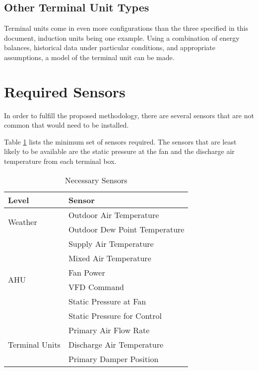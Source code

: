 \subsection{Other Terminal Unit Types}

Terminal units come in even more configurations than the three specified in this document, induction units being one example. Using a combination of energy balances, historical data under particular conditions, and appropriate assumptions, a model of the terminal unit can be made. 

\section{Required Sensors}

In order to fulfill the proposed methodology, there are several sensors that are not common that would need to be installed. 

Table \ref{tab:NecessarySensors} lists the minimum set of sensors required. The sensors that are least likely to be available are the static pressure at the fan and the discharge air temperature from each terminal box.

\begin{table}
\centering
\begin{tabular}{l l}
\toprule

Level & Sensor \\
\midrule\midrule
\multirow{2}{*}{Weather} & Outdoor Air Temperature \\
 & Outdoor Dew Point Temperature \\
 
 \midrule
 
 \multirow{6}{*}{AHU} & Supply Air Temperature \\
 & Mixed Air Temperature \\
 & Fan Power \\
 & VFD Command \\
 & Static Pressure at Fan \\
 & Static Pressure for Control \\
 
 
\midrule
\multirow{4}{*}{Terminal Units} & Primary Air Flow Rate \\
& Discharge Air Temperature \\
& Primary Damper Position \\

\bottomrule

\end{tabular}
\caption{Necessary Sensors}
\label{tab:NecessarySensors}
\end{table}

